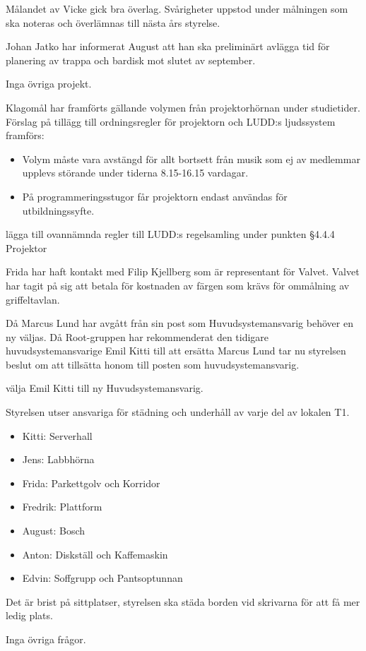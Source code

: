 \documentclass{protokoll}
\begin{document}
Målandet av Vicke gick bra överlag. Svårigheter uppstod under målningen som ska noteras och överlämnas till nästa års styrelse. 

Johan Jatko har informerat August att han ska preliminärt avlägga tid för planering av trappa och bardisk mot slutet av september.

Inga övriga projekt.

Klagomål har framförts gällande volymen från projektorhörnan under studietider. Förslag på tillägg till ordningsregler för projektorn och LUDD:s ljudssystem framförs: 
\begin{itemize}
	\item Volym måste vara avstängd för allt bortsett från musik som ej av medlemmar upplevs störande under tiderna 8.15-16.15 vardagar. 
	\item På programmeringsstugor får projektorn endast användas för utbildningssyfte.
\end{itemize}

\begin{beslut}
    \att lägga till ovannämnda regler till LUDD:s regelsamling under punkten §4.4.4 Projektor
\end{beslut}

Frida har haft kontakt med Filip Kjellberg som är representant för Valvet. Valvet har tagit på sig att betala för kostnaden av färgen som krävs för ommålning av griffeltavlan. 

Då Marcus Lund har avgått från sin post som Huvudsystemansvarig behöver en ny väljas. Då Root-gruppen har rekommenderat den tidigare huvudsystemansvarige Emil Kitti till att ersätta Marcus Lund tar nu styrelsen beslut om att tillsätta honom till posten som huvudsystemansvarig. 
\begin{beslut}
    \att välja Emil Kitti till ny Huvudsystemansvarig.
\end{beslut}

Styrelsen utser ansvariga för städning och underhåll av varje del av lokalen T1. 
\begin{itemize}
    \item Kitti: Serverhall 
    \item Jens: Labbhörna
    \item Frida: Parkettgolv och Korridor
    \item Fredrik: Plattform
    \item August: Bosch
    \item Anton: Diskställ och Kaffemaskin
    \item Edvin: Soffgrupp och Pantsoptunnan
\end{itemize}

Det är brist på sittplatser, styrelsen ska städa borden vid skrivarna för att få mer ledig plats.

Inga övriga frågor.
\end{document}
